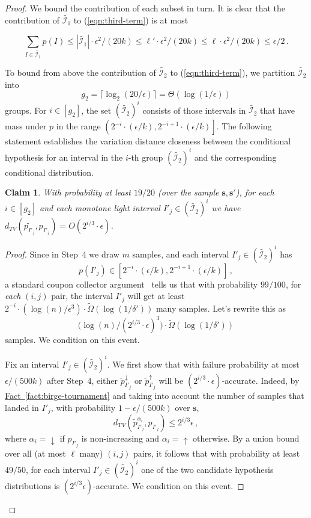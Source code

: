 \documentclass[10pt]{article}
\newtheorem{claim}[theorem]{Claim}
\theoremstyle{definition}
\numberwithin{equation}{section}
\newcommand{\expref}[2]{\texorpdfstring{\hyperref[#2]{#1~\ref{#2}}}{#1~\ref{#2}}}
\newcommand{\dtv}{d_{\mathrm TV}}
\newcommand{\eps}{\epsilon}
\begin{document}
\begin{proof}
{We bound the contribution of each subset in turn.
It is clear that the contribution of  $\widetilde{\mathcal{I}_1}$
to (\ref{eqn:third-term}) is at most 

$$\sum_{I \in \widetilde{\mathcal{I}_1}} p(I) \le |\widetilde{\mathcal{I}_1}| \cdot \eps^2/(20k) \le   \ell' \cdot \eps^2/(20k) \leq \ell \cdot \eps^2/(20k) \leq \eps/2\,.$$

}

To bound from above the contribution of {$\widetilde{\mathcal{I}_2}$} to (\ref{eqn:third-term}),
we partition {$\widetilde{\mathcal{I}_2}$} into
\[
g_2 = \lceil \log_2 (20/\eps) \rceil =  \Theta (\log(1/\eps))
\]
 groups.
For $i \in [{g_2}]$, the set $(\widetilde{\mathcal{I}_2})^i$
consists of those intervals in  $\widetilde{\mathcal{I}_2}$
that have mass under $p$ in the range
{$\left(  2^{-i} \cdot (\eps/k), 2^{-i+1} \cdot (\eps/k) \right]$}.
{The following statement establishes the variation distance closeness between the conditional hypothesis
for an interval in the $i$-th group $(\widetilde{\mathcal{I}_2})^i$ and the corresponding conditional distribution.}
\begin{claim} \label{claim:not-too-light}
With probability at least $19/20$ (over the sample $\mathbf{s}, \mathbf{s'}$),
for each $i \in [{g_2}]$ and each monotone light interval $I'_j \in {(\widetilde{\mathcal{I}_2})^i}$ we have
$d_{TV}(\widetilde{p_{I'_j}},p_{I'_j}) = O({2^{i/3} \cdot \eps})$.
\end{claim}
\begin{proof} %
Since in Step~4 we draw $m$ samples, and each interval $I'_j \in
{(\widetilde{\mathcal{I}_2})^i}$ has
\[
p(I'_j) \in  { \left[ 2^{-i} \cdot (\eps/k), 2^{-i+1} \cdot (\eps/k)
  \right]}\,,
\]
a standard coupon collector argument~\cite{NS:60} tells us that with probability $99/100$, for \emph{each}
$(i,j)$ pair, the interval $I'_j$ will get at least
${2^{-i} \cdot (\log (n) / \eps^3)} \cdot \tilde{\Omega}( \log(1/\delta'))$ many samples.
Let's rewrite this as
\[
\bigl(\log (n) / (2^{i/3} \cdot \eps)^3\bigr) \cdot \tilde{\Omega}(
\log(1/\delta'))
\]
samples.
We condition on this event.

Fix an interval $I'_j \in {(\widetilde{\mathcal{I}_2})^i}$. We first show that with failure probability
at most  $\eps/(500k)$ after Step~4, either $\widetilde{p}^{\downarrow}_{I'_j}$ or
$\widetilde{p}^{\uparrow}_{I'_j}$ will be {$(2^{i/3} \cdot \eps)$}-accurate.
Indeed, by \expref{Fact}{fact:birge-tournament} and taking into account the number of samples
that landed in $I'_j$, with probability $1-\eps/(500k)$ over $\mathbf{s}$,
\[
\dtv (\widetilde{p}^{\alpha_i}_{I'_j}, p_{I'_j})  \leq {2^{i/3}
  \eps}\,,
\]
where $\alpha_i = \downarrow$ if $p_{I'_j}$ is non-increasing and  $\alpha_i = \uparrow$ otherwise.
By a union bound over all (at most $\ell$ many) $(i,j)$ pairs,
it follows that with probability at least $49/50$, for each interval $I'_j \in {(\widetilde{\mathcal{I}_2})^i}$
one of the two candidate hypothesis distributions is ${(2^{i/3} \eps)}$-accurate. We condition on this event.


\end{proof}
\end{proof}
\end{document}
